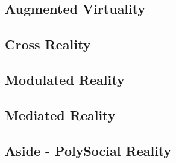 

\subsection{Augmented Virtuality}


\subsection{Cross Reality}

\subsection{Modulated Reality}

\subsection{Mediated Reality}

\subsection{Aside - PolySocial Reality}


